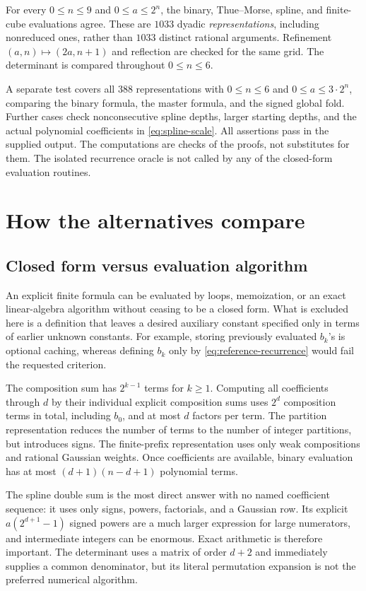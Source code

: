 \documentclass[11pt,a4paper]{article}
\theoremstyle{definition}
\theoremstyle{remark}
\begin{document}
For every \(0\leq n\leq9\) and \(0\leq a\leq2^n\), the binary, Thue--Morse,
spline, and finite-cube evaluations agree.  These are \(1033\) dyadic
\emph{representations}, including nonreduced ones, rather than \(1033\) distinct
rational arguments.  Refinement \((a,n)\mapsto(2a,n+1)\) and reflection are checked
for the same grid.  The determinant is compared throughout \(0\leq n\leq6\).

A separate test covers all \(388\) representations with \(0\leq n\leq6\) and
\(0\leq a\leq3\cdot2^n\), comparing the binary formula, the master formula, and
the signed global fold.  Further cases check nonconsecutive spline depths, larger
starting depths, and the actual polynomial coefficients in
\eqref{eq:spline-scale}.  All assertions pass in the supplied output.
The computations are checks of the proofs, not substitutes for them.  The isolated
recurrence oracle is not called by any of the closed-form evaluation routines.

\section{How the alternatives compare}
\label{sec:comparison}
\subsection{Closed form versus evaluation algorithm}
An explicit finite formula can be evaluated by loops, memoization, or an exact
linear-algebra algorithm without ceasing to be a closed form.  What is excluded
here is a definition that leaves a desired auxiliary constant specified only in
terms of earlier unknown constants.  For example, storing previously evaluated
\(b_k\)'s is optional caching, whereas defining \(b_k\) only by
\eqref{eq:reference-recurrence} would fail the requested criterion.

The composition sum has \(2^{k-1}\) terms for \(k\geq1\).  Computing all
coefficients through \(d\) by their individual explicit composition sums uses
\(2^d\) composition terms in total, including \(b_0\), and at most \(d\) factors
per term.  The partition representation reduces the number of terms to the number
of integer partitions, but introduces signs.  The finite-prefix representation
uses only weak compositions and rational Gaussian weights.  Once coefficients are
available, binary evaluation has at most \((d+1)(n-d+1)\) polynomial terms.

The spline double sum is the most direct answer with no named coefficient sequence:
it uses only signs, powers, factorials, and a Gaussian row.  Its explicit
\(a(2^{d+1}-1)\) signed powers are a much larger expression for large numerators,
and intermediate integers can be enormous.  Exact arithmetic is therefore
important.  The determinant uses a matrix of order \(d+2\) and immediately supplies
a common denominator, but its literal permutation expansion is not the preferred
numerical algorithm.
\end{document}
